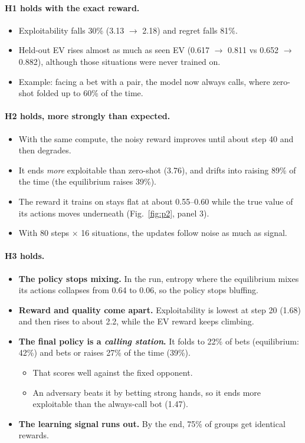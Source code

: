 \documentclass[10.5pt]{article}
\begin{document}
\paragraph{H1 holds with the exact reward.}
\begin{itemize}
\item Exploitability falls 30\% (3.13 $\to$ 2.18) and regret falls 81\%.
\item Held-out EV rises almost as much as seen EV (0.617 $\to$ 0.811 vs 0.652 $\to$ 0.882), although those situations
  were never trained on.
\item Example: facing a bet with a pair, the model now always calls, where zero-shot folded up to 60\% of the time.
\end{itemize}

\paragraph{H2 holds, more strongly than expected.}
\begin{itemize}
\item With the same compute, the noisy reward improves until about step 40 and then degrades.
\item It ends \emph{more} exploitable than zero-shot (3.76), and drifts into raising 89\% of the time (the equilibrium raises 39\%).
\item The reward it trains on stays flat at about 0.55--0.60 while the true value of its actions moves underneath
  (Fig.~\ref{fig:p2}, panel 3).
\item With 80 steps $\times$ 16 situations, the updates follow noise as much as signal.
\end{itemize}

\paragraph{H3 holds.}
\begin{itemize}
\item \textbf{The policy stops mixing.} In the  run, entropy where the equilibrium mixes its actions collapses
  from 0.64 to 0.06, so the policy stops bluffing.
\item \textbf{Reward and quality come apart.} Exploitability is lowest at step 20 (1.68) and then rises to about 2.2,
  while the EV reward keeps climbing.
\item \textbf{The final policy is a \emph{calling station}.} It folds to 22\% of bets (equilibrium: 42\%) and bets or
  raises 27\% of the time (39\%).
  \begin{itemize}
  \item That scores well against the fixed opponent.
  \item An adversary beats it by betting strong hands, so it ends more exploitable than the always-call bot (1.47).
  \end{itemize}
\item \textbf{The learning signal runs out.} By the end, 75\% of groups get identical rewards.
\end{itemize}
\end{document}

